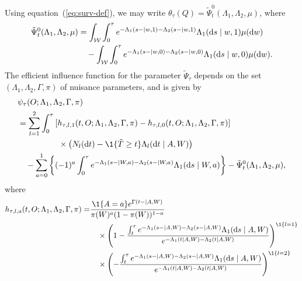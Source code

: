 \documentclass[a4,danish]{article}
\begin{document}
Using equation~(\ref{eq:surv-def}), we may write
\( \theta_{{\tau}}(Q) = \tilde{\Psi}_{t}^0(\Lambda_1, \Lambda_2, \mu) \),
where
\begin{equation}
  \label{eq:1}    
  \begin{split}
  \tilde{\Psi}_{t}^0(\Lambda_1, \Lambda_2, \mu) & =
  \int_{\mathcal{W}} 
  \int_0^{\tau}
  e^{-\Lambda_1(s- \mid w, 1)-\Lambda_2(s- \mid w, 1)}  \Lambda_1(\mathop{}\!\mathrm{d} s \mid
  w, 1)
  \mu(\mathop{}\!\mathrm{d} w)
  \\
  &  \quad
  -\int_{\mathcal{W}} 
  \int_0^{\tau}
  e^{-\Lambda_1(s- \mid w, 0)-\Lambda_2(s- \mid w, 0)}  \Lambda_1(\mathop{}\!\mathrm{d} s \mid w, 0)
  \mu(\mathop{}\!\mathrm{d} w).
  \end{split}
\end{equation}
The efficient influence function for the parameter $\tilde{\Psi}_{\tau}$
depends on the set \( (\Lambda_1, \Lambda_2, \Gamma, \pi) \) of nuisance
parameters, and is given by 
\begin{equation}
  \label{eq:5}
  \begin{split}
    & \psi_{\tau}(O; \Lambda_1, \Lambda_2, \Gamma, \pi)
    \\
    & =
      \sum_{l=1}^{2} \int_0^{\tau}
      \left[
      h_{\tau,l,1}(t, O  ; \Lambda_1, \Lambda_2, \Gamma, \pi)
      - h_{\tau,l,0}(t, O  ; \Lambda_1, \Lambda_2, \Gamma, \pi)
      \right]
    \\
    & \quad\qquad  \qquad
      \times
      \left(
      N_l(\diff t) - \1{\{\tilde{T} \geq t\}}\Lambda_l(\diff t \mid A, W)
      \right)
    \\
    & \quad
      -\sum_{a=0}^{1} 
      \left\{
      (-1)^a
      \int_0^{\tau}
      e^{-\Lambda_1(s- \mid W, a)-\Lambda_2(s- \mid W, a)}  \Lambda_1(\diff s \mid
      W, a)
      \right\}
      - \tilde{\Psi}_{t}^0(\Lambda_1, \Lambda_2, \mu),
  \end{split}
\end{equation}
where
\begin{align*}
  h_{\tau,l,a}(t, O  ; \Lambda_1, \Lambda_2, \Gamma, \pi)
  =&  \frac{\1{\{A=a\}} e^{\Gamma(t-\mid A, W)}}{\pi(W)^{a}(1-\pi(W))^{1-a}}
  \\
   & \quad \times
     \left(
     1- \frac{\int_t^{\tau} e^{-\Lambda_1(s- \mid A, W)-\Lambda_2(s- \mid A, W)}
     \Lambda_1(\diff s \mid A, W)}
     {e^{-\Lambda_1(t \mid A, W)-\Lambda_2(t \mid A, W)}}
     \right)^{\1{\{l=1\}}}
  \\
   & \quad\times
     \left(
     - \frac{\int_t^{\tau} e^{-\Lambda_1(s- \mid A, W)-\Lambda_2(s- \mid A, W)}
     \Lambda_1(\diff s \mid A, W)}
     {e^{-\Lambda_1(t \mid A, W)-\Lambda_2(t \mid A, W)}}
     \right)^{\1{\{l=2\}}}
\end{align*}
\end{document}
